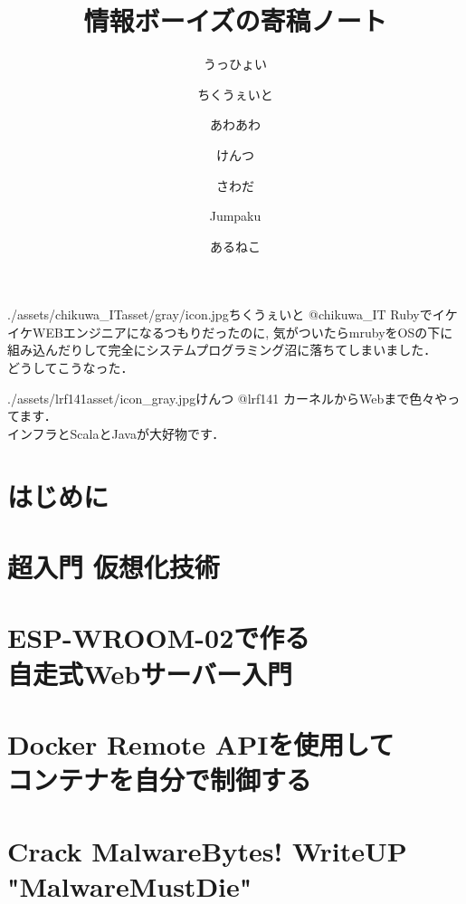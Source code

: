 \documentclass[autodetect-engine,dvipdfmx-if-dvi,ja=standard,b5paper,10.5pt,twoside,openany,layout=v2]{bxjsbook}
\title{情報ボーイズの寄稿ノート}
\author{うっひょい \and ちくうぇいと \and あわあわ \and けんつ \and さわだ \and Jumpaku \and あるねこ}
\date{}
\newcommand{\articlepath}{./articles}
\newcommand{\assetspath}{./assets}
\newcommand{\lrfasset}{\assetspath/lrf141asset}
\newcommand{\chikuwaitasset}{\assetspath/chikuwa_ITasset/gray}
\begin{document}
\frontmatter
\maketitle
\begin{myintroduce}{\chikuwaitasset/icon.jpg}{ちくうぇいと @chikuwa\_IT}
  RubyでイケイケWEBエンジニアになるつもりだったのに, 気がついたらmrubyをOSの下に組み込んだりして完全にシステムプログラミング沼に落ちてしまいました．\\
  どうしてこうなった．
\end{myintroduce}
\begin{myintroduce}{\lrfasset/icon_gray.jpg}{けんつ @lrf141}
  カーネルからWebまで色々やってます．\\
  インフラとScalaとJavaが大好物です．
\end{myintroduce}


\chapter{はじめに}
\addtolength{\oddsidemargin}{10pt}
\addtolength{\evensidemargin}{-10pt}


\tableofcontents
\mainmatter

\chapter{超入門 仮想化技術}


\chapter{ESP-WROOM-02で作る \\自走式Webサーバー入門}


\chapter{Docker Remote APIを使用して\\コンテナを自分で制御する}


\chapter{Crack MalwareBytes! WriteUP "MalwareMustDie"}

\end{document}
